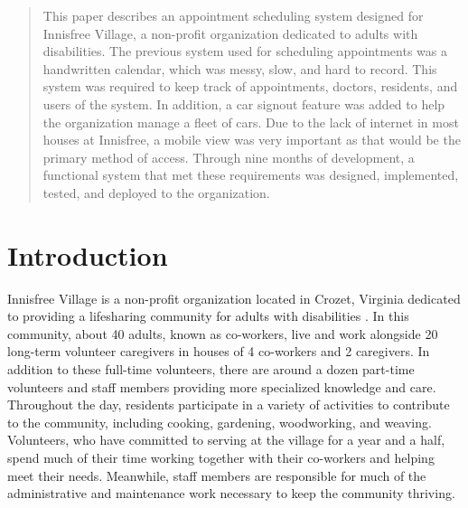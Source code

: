 \documentclass{sig-alternate}
\begin{document}
\maketitle
\begin{abstract}
This paper describes an appointment scheduling system designed for Innisfree Village, a non-profit organization dedicated to adults with disabilities. The previous system used for scheduling appointments was a handwritten calendar, which was messy, slow, and hard to record. This system was required to keep track of appointments, doctors, residents, and users of the system. In addition, a car signout feature was added to help the organization manage a fleet of cars. Due to the lack of internet in most houses at Innisfree, a mobile view was very important as that would be the primary method of access. Through nine months of development, a functional system that met these requirements was designed, implemented, tested, and deployed to the organization.
\end{abstract}




\section{Introduction}
Innisfree Village is a non-profit organization located in Crozet, Virginia dedicated to providing a lifesharing community for adults with disabilities \cite{innisfree}. In this community, about 40 adults, known as co-workers, live and work alongside 20 long-term volunteer caregivers in houses of 4 co-workers and 2 caregivers. In addition to these full-time volunteers, there are around a dozen part-time volunteers and staff members providing more specialized knowledge and care. Throughout the day, residents participate in a variety of activities to contribute to the community, including cooking, gardening, woodworking, and weaving. Volunteers, who have committed to serving at the village for a year and a half, spend much of their time working together with their co-workers and helping meet their needs. Meanwhile, staff members are responsible for much of the administrative and maintenance work necessary to keep the community thriving.
\end{document}
